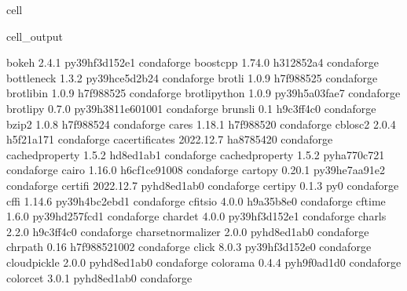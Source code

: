 \documentclass[letterpaper,table,10pt,english]{jupyterBook}
\begin{document}
\begin{sphinxuseclass}{cell}
\begin{sphinxVerbatimOutput}
\begin{sphinxuseclass}{cell_output}
\begin{sphinxVerbatim}[commandchars=\\\{\}]
bokeh                     2.4.1            py39hf3d152e\PYGZus{}1    conda\PYGZhy{}forge
boost\PYGZhy{}cpp                 1.74.0               h312852a\PYGZus{}4    conda\PYGZhy{}forge
bottleneck                1.3.2            py39hce5d2b2\PYGZus{}4    conda\PYGZhy{}forge
brotli                    1.0.9                h7f98852\PYGZus{}5    conda\PYGZhy{}forge
brotli\PYGZhy{}bin                1.0.9                h7f98852\PYGZus{}5    conda\PYGZhy{}forge
brotli\PYGZhy{}python             1.0.9            py39h5a03fae\PYGZus{}7    conda\PYGZhy{}forge
brotlipy                  0.7.0           py39h3811e60\PYGZus{}1001    conda\PYGZhy{}forge
brunsli                   0.1                  h9c3ff4c\PYGZus{}0    conda\PYGZhy{}forge
bzip2                     1.0.8                h7f98852\PYGZus{}4    conda\PYGZhy{}forge
c\PYGZhy{}ares                    1.18.1               h7f98852\PYGZus{}0    conda\PYGZhy{}forge
c\PYGZhy{}blosc2                  2.0.4                h5f21a17\PYGZus{}1    conda\PYGZhy{}forge
ca\PYGZhy{}certificates           2022.12.7            ha878542\PYGZus{}0    conda\PYGZhy{}forge
cached\PYGZhy{}property           1.5.2                hd8ed1ab\PYGZus{}1    conda\PYGZhy{}forge
cached\PYGZus{}property           1.5.2              pyha770c72\PYGZus{}1    conda\PYGZhy{}forge
cairo                     1.16.0            h6cf1ce9\PYGZus{}1008    conda\PYGZhy{}forge
cartopy                   0.20.1           py39he7aa91e\PYGZus{}2    conda\PYGZhy{}forge
certifi                   2022.12.7          pyhd8ed1ab\PYGZus{}0    conda\PYGZhy{}forge
certipy                   0.1.3                      py\PYGZus{}0    conda\PYGZhy{}forge
cffi                      1.14.6           py39h4bc2ebd\PYGZus{}1    conda\PYGZhy{}forge
cfitsio                   4.0.0                h9a35b8e\PYGZus{}0    conda\PYGZhy{}forge
cftime                    1.6.0            py39hd257fcd\PYGZus{}1    conda\PYGZhy{}forge
chardet                   4.0.0            py39hf3d152e\PYGZus{}1    conda\PYGZhy{}forge
charls                    2.2.0                h9c3ff4c\PYGZus{}0    conda\PYGZhy{}forge
charset\PYGZhy{}normalizer        2.0.0              pyhd8ed1ab\PYGZus{}0    conda\PYGZhy{}forge
chrpath                   0.16              h7f98852\PYGZus{}1002    conda\PYGZhy{}forge
click                     8.0.3            py39hf3d152e\PYGZus{}0    conda\PYGZhy{}forge
cloudpickle               2.0.0              pyhd8ed1ab\PYGZus{}0    conda\PYGZhy{}forge
colorama                  0.4.4              pyh9f0ad1d\PYGZus{}0    conda\PYGZhy{}forge
colorcet                  3.0.1              pyhd8ed1ab\PYGZus{}0    conda\PYGZhy{}forge

\end{sphinxVerbatim}
\end{sphinxuseclass}
\end{sphinxVerbatimOutput}
\end{sphinxuseclass}
\end{document}

